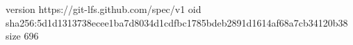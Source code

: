version https://git-lfs.github.com/spec/v1
oid sha256:5d1d1313738ecee1ba7d8034d1cdfbc1785bdeb2891d1614af68a7cb34120b38
size 696
